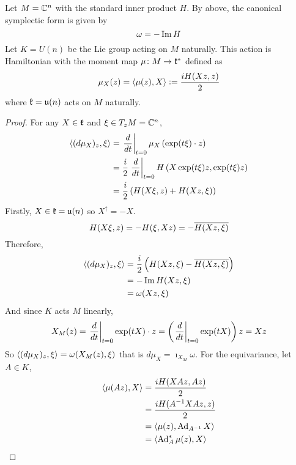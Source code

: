\documentclass[a4paper,12pt]{article}
\begin{document}
	\begin{exam}
		Let $M = \mathbb{C}^n$ with the standard inner product $H$. By above, the canonical symplectic form is given by
		\begin{equation*}
			\omega = - \operatorname{Im} H
		\end{equation*}
		Let $K = U(n)$ be the Lie group acting on $M$ naturally. This action is Hamiltonian with the moment map $\mu \colon M \rightarrow \mathfrak{k}^*$ defined as
		\begin{equation*}
			\mu_X(z) = \left\langle \mu(z),X \right\rangle \vcentcolon= \frac{iH(Xz,z)}{2}
		\end{equation*}
		where $\mathfrak{k} = \mathfrak{u}(n)$ acts on $M$ naturally.
		\begin{proof}
			For any $X \in \mathfrak{k}$ and $\xi \in T_zM = \mathbb{C}^n$,
			\begin{equation*}
				\begin{split}
					\left\langle (d\mu_X)_z,\xi \right\rangle &= \left.\frac{d}{dt}\right\lvert_{t=0} \mu_X\left(\exp(t\xi)\cdot z\right) \\
					&= \frac{i}{2}\left.\frac{d}{dt}\right\lvert_{t=0} H\left(X\exp(t\xi)z,\exp(t\xi)z\right) \\
					&=	\frac{i}{2} \left(H(X\xi,z)+H(Xz,\xi)\right)
				\end{split}
			\end{equation*}
			Firstly, $X \in \mathfrak{k} = \mathfrak{u}(n)$ so $X^{\dagger} = -X$.
			\begin{equation*}
				H(X\xi,z) = -H(\xi,Xz) = -\overline{H(Xz,\xi)}
			\end{equation*}
			Therefore,
			\begin{equation*}
				\begin{split}
					\left\langle (d\mu_X)_z,\xi \right\rangle &= \frac{i}{2}\left(H(Xz,\xi)-\overline{H(Xz,\xi)}\right) \\
					&=-\operatorname{Im} H(Xz,\xi) \\
					&= \omega(Xz,\xi)
				\end{split}
			\end{equation*}
			And since $K$ acts $M$ linearly,
			\begin{equation*}
				X_M(z) = \left.\frac{d}{dt}\right\lvert_{t=0} \exp(tX)\cdot z = \left(\left.\frac{d}{dt}\right\lvert_{t=0} \exp(tX)\right)z = Xz
			\end{equation*}
			So $\left\langle (d\mu_X)_z,\xi \right\rangle = \omega(X_M(z),\xi)$ that is $d \mu_X = \imath_{X_M}\omega$. For the equivariance, let $A \in K$,
			\begin{equation*}
				\begin{split}
					\left\langle \mu(Az),X \right\rangle &= \frac{iH(XAz,Az)}{2} \\
					&= \frac{iH(A^{-1}XAz,z)}{2} \\
					&= \left\langle \mu(z),\operatorname{Ad}_{A^{-1}}X \right\rangle \\
					&= \left\langle \operatorname{Ad}_A^*\mu(z),X \right\rangle \qedhere
				\end{split}
			\end{equation*}
		\end{proof}
	\end{exam}
\end{document}
